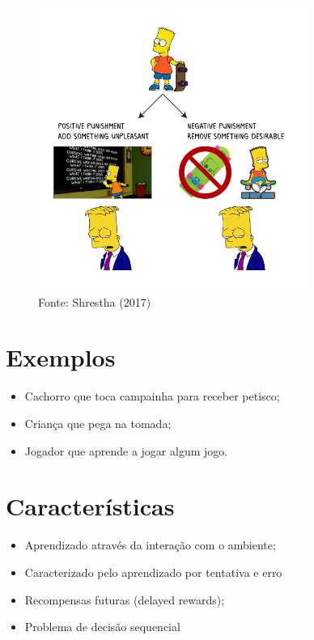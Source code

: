 \documentclass{article}
\begin{document}
        \begin{figure}[ht]
            \centering
            \includegraphics[width=250pt]{bart-punishment.png}
            \caption{Fonte: Shrestha (2017)}
            \label{fig:bart-punicao}
        \end{figure}
        
\section{Exemplos}

    \begin{itemize}
        \item Cachorro que toca campainha para receber petisco;
        \item Criança que pega na tomada;
        \item Jogador que aprende a jogar algum jogo.
    \end{itemize}
        
\section{Características}

    \begin{itemize}
        \item Aprendizado através da interação com o ambiente;
        \item Caracterizado pelo aprendizado por tentativa e erro
        \item Recompensas futuras (delayed rewards);
        \item Problema de decisão sequencial
    \end{itemize}
    
\end{document}
